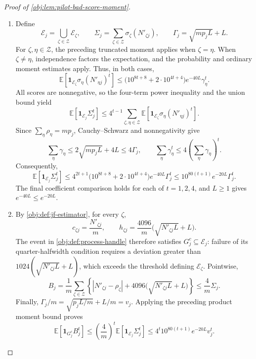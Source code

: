 \begin{proof}[Proof of \cref{obj:lem:pilot-bad-score-moment}]
\begin{enumerate}
For \(t\in\{1,2,4\}\), the elementary square inequality gives
\[
\mathbf1_{\mathscr E_\zeta}\sigma_\zeta(N'_{\zeta j})^t
\leq\frac12\left[
e^{-40L}\gamma_\zeta^{-t}\sigma_\zeta(N'_{\zeta j})^{2t}
+e^{40L}\gamma_\zeta^t\mathbf1_{\mathscr E_\zeta}
\right].
\]
Taking expectations and using the two estimates above gives
\[
\mathbb E\!\left[
\mathbf1_{\mathscr E_\zeta}\sigma_\zeta(N'_{\zeta j})^t
\right]
\leq
\frac{10^{8t+4}+2}{2}e^{-40L}\gamma_\zeta^t
\leq10^{8t+8}e^{-40L}\gamma_\zeta^t.
\]

\item Define
\[
\mathscr E_j=\bigcup_{\zeta\in\mathcal Z}\mathscr E_\zeta,\qquad
\Sigma_j=\sum_{\zeta\in\mathcal Z}\sigma_\zeta(N'_{\zeta j}),
\qquad
\Gamma_j=\sqrt{mp_jL}+L.
\]
For \(\zeta,\eta\in\mathcal Z\), the preceding truncated moment applies when
\(\zeta=\eta\). When \(\zeta\ne\eta\), independence factors the expectation, and the probability and ordinary moment estimates apply. Thus, in both cases,
\[
\mathbb E\!\left[
\mathbf1_{\mathscr E_\zeta}
\sigma_\eta(N'_{\eta j})^t
\right]
\leq
\bigl(10^{8t+8}+2\cdot10^{4t+4}\bigr)
e^{-40L}\gamma_\eta^t.
\]
All scores are nonnegative, so the four-term power inequality and the union bound yield
\[
\mathbb E[\mathbf1_{\mathscr E_j}\Sigma_j^t]
\leq
4^{t-1}\sum_{\zeta,\eta\in\mathcal Z}
\mathbb E\!\left[
\mathbf1_{\mathscr E_\zeta}
\sigma_\eta(N'_{\eta j})^t
\right].
\]
Since \(\sum_\eta\rho_\eta=mp_j\), Cauchy–Schwarz and nonnegativity give
\[
\sum_\eta\gamma_\eta
\leq2\sqrt{mp_jL}+4L\leq4\Gamma_j,
\qquad
\sum_\eta\gamma_\eta^t
\leq4\left(\sum_\eta\gamma_\eta\right)^t.
\]
Consequently,
\[
\mathbb E[\mathbf1_{\mathscr E_j}\Sigma_j^t]
\leq
4^{2t+1}
\bigl(10^{8t+8}+2\cdot10^{4t+4}\bigr)
e^{-40L}\Gamma_j^t
\leq10^{80(t+1)}e^{-20L}\Gamma_j^t.
\]
The final coefficient comparison holds for each of \(t=1,2,4\), and \(L\geq1\) gives \(e^{-40L}\leq e^{-20L}\).

\item By \cref{obj:def:jf-estimator}, for every \(\zeta\),
\[
c_{\zeta j}=\frac{N'_{\zeta j}}m,\qquad
h_{\zeta j}=\frac{4096}{m}
\bigl(\sqrt{N'_{\zeta j}L}+L\bigr).
\]
The event in \cref{obj:def:process-handle} therefore satisfies
\(G_j^c\subseteq\mathscr E_j\): failure of its quarter-halfwidth condition requires a deviation greater than \(1024(\sqrt{N'_{\zeta j}L}+L)\), which exceeds the threshold defining \(\mathscr E_\zeta\). Pointwise,
\[
B_j
=\frac1m\sum_{\zeta\in\mathcal Z}
\left\{|N'_{\zeta j}-\rho_\zeta|
+4096\bigl(\sqrt{N'_{\zeta j}L}+L\bigr)\right\}
\leq\frac4m\Sigma_j.
\]
Finally, \(\Gamma_j/m=\sqrt{p_jL/m}+L/m=v_j\). Applying the preceding product moment bound proves
\[
\mathbb E[\mathbf1_{G_j^c}B_j^t]
\leq\left(\frac4m\right)^t
\mathbb E[\mathbf1_{\mathscr E_j}\Sigma_j^t]
\leq4^t10^{80(t+1)}e^{-20L}v_j^t.
\]
\end{enumerate}
\end{proof}
